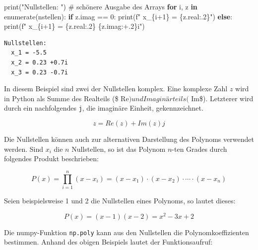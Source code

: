 \documentclass[
  letterpaper,
  DIV=11,
  numbers=noendperiod]{scrreprt}
\newenvironment{Shaded}{\begin{snugshade}}{\end{snugshade}}
\newcommand{\BuiltInTok}[1]{\textcolor[rgb]{0.00,0.23,0.31}{#1}}
\newcommand{\CommentTok}[1]{\textcolor[rgb]{0.37,0.37,0.37}{#1}}
\newcommand{\ControlFlowTok}[1]{\textcolor[rgb]{0.00,0.23,0.31}{\textbf{#1}}}
\newcommand{\DecValTok}[1]{\textcolor[rgb]{0.68,0.00,0.00}{#1}}
\newcommand{\KeywordTok}[1]{\textcolor[rgb]{0.00,0.23,0.31}{\textbf{#1}}}
\newcommand{\NormalTok}[1]{\textcolor[rgb]{0.00,0.23,0.31}{#1}}
\newcommand{\OperatorTok}[1]{\textcolor[rgb]{0.37,0.37,0.37}{#1}}
\newcommand{\SpecialCharTok}[1]{\textcolor[rgb]{0.37,0.37,0.37}{#1}}
\newcommand{\SpecialStringTok}[1]{\textcolor[rgb]{0.13,0.47,0.30}{#1}}
\newcommand{\StringTok}[1]{\textcolor[rgb]{0.13,0.47,0.30}{#1}}
\begin{document}
\begin{Shaded}
\begin{Highlighting}[]
\BuiltInTok{print}\NormalTok{(}\StringTok{"Nullstellen: "}\NormalTok{)}
\CommentTok{\# schönere Ausgabe des Arrays}
\ControlFlowTok{for}\NormalTok{ i, z }\KeywordTok{in} \BuiltInTok{enumerate}\NormalTok{(nstellen):}
    \ControlFlowTok{if}\NormalTok{ z.imag }\OperatorTok{==} \DecValTok{0}\NormalTok{:}
        \BuiltInTok{print}\NormalTok{(}\SpecialStringTok{f"  x\_}\SpecialCharTok{\{}\NormalTok{i}\OperatorTok{+}\DecValTok{1}\SpecialCharTok{\}}\SpecialStringTok{ = }\SpecialCharTok{\{}\NormalTok{z}\SpecialCharTok{.}\NormalTok{real}\SpecialCharTok{:.2\}}\SpecialStringTok{"}\NormalTok{)}
    \ControlFlowTok{else}\NormalTok{:}
        \BuiltInTok{print}\NormalTok{(}\SpecialStringTok{f"  x\_}\SpecialCharTok{\{}\NormalTok{i}\OperatorTok{+}\DecValTok{1}\SpecialCharTok{\}}\SpecialStringTok{ = }\SpecialCharTok{\{}\NormalTok{z}\SpecialCharTok{.}\NormalTok{real}\SpecialCharTok{:.2\}}\SpecialStringTok{ }\SpecialCharTok{\{}\NormalTok{z}\SpecialCharTok{.}\NormalTok{imag}\SpecialCharTok{:+.2\}}\SpecialStringTok{i"}\NormalTok{)}
\end{Highlighting}
\end{Shaded}

\begin{verbatim}
Nullstellen: 
  x_1 = -5.5
  x_2 = 0.23 +0.7i
  x_3 = 0.23 -0.7i
\end{verbatim}

In diesem Beispiel sind zwei der Nullstellen komplex. Eine komplexe Zahl
\(z\) wird in Python als Summe des Realteils (\$
Re\() und Imaginärteils (\) Im\$). Letzterer wird durch ein
nachfolgendes \texttt{j}, die imaginäre Einheit, gekennzeichnet.

\[ z = Re(z) + Im(z)j\]

Die Nullstellen können auch zur alternativen Darstellung des Polynoms
verwendet werden. Sind \(x_i\) die \(n\) Nullstellen, so ist das Polynom
\(n\)-ten Grades durch folgendes Produkt beschrieben:

\[ P(x) = \prod_{i=1}^n \left(x - x_i\right) = (x - x_1)\cdot (x - x_2) \cdot \cdots \cdot (x - x_n) \]

Seien beispielsweise 1 und 2 die Nullstellen eines Polynoms, so lautet
dieses:

\[  P(x) = (x - 1)(x - 2) = x^2 - 3x +2 \]

Die numpy-Funktion \texttt{np.poly} kann aus den Nullstellen die
Polynomkoeffizienten bestimmen. Anhand des obigen Beispiels lautet der
Funktionsaufruf:
\end{document}

